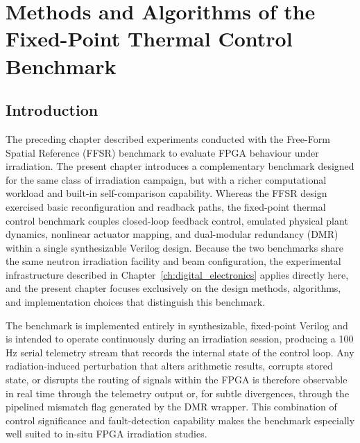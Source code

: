 
\chapter{Methods and Algorithms of the Fixed-Point Thermal Control Benchmark}
\label{chap:fpga_benchmark}

\section{Introduction}
\label{sec:bench_intro}

The preceding chapter described experiments conducted with the
Free-Form Spatial Reference (FFSR) benchmark to evaluate FPGA behaviour
under irradiation.  The present chapter introduces a complementary
benchmark designed for the same class of irradiation campaign, but with
a richer computational workload and built-in self-comparison capability.
Whereas the FFSR design exercised basic reconfiguration and readback
paths, the fixed-point thermal control benchmark couples closed-loop
feedback control, emulated physical plant dynamics, nonlinear actuator
mapping, and dual-modular redundancy (DMR) within a single synthesizable
Verilog design.  Because the two benchmarks share the same neutron
irradiation facility and beam configuration, the experimental
infrastructure described in Chapter~\ref{ch:digital_electronics} applies directly
here, and the present chapter focuses exclusively on the design methods,
algorithms, and implementation choices that distinguish this benchmark.

The benchmark is implemented entirely in synthesizable, fixed-point
Verilog and is intended to operate continuously during an irradiation
session, producing a 100\,Hz serial telemetry stream that records the
internal state of the control loop.  Any radiation-induced perturbation
that alters arithmetic results, corrupts stored state, or disrupts the
routing of signals within the FPGA is therefore observable in real time
through the telemetry output or, for subtle divergences, through the
pipelined mismatch flag generated by the DMR wrapper.  This combination
of control significance and fault-detection capability makes the
benchmark especially well suited to in-situ FPGA irradiation studies.

